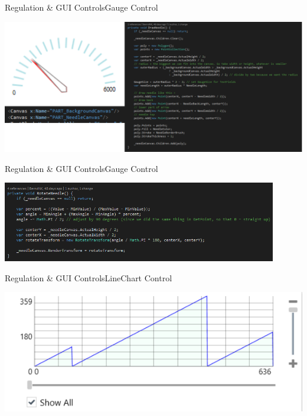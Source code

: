 	\begin{frame}{Regulation \& GUI Controls}{Gauge Control}
		\begin{center}		
			\includegraphics[width=1.05\textwidth]{../regulation/GaugeControlComplete.png}	
		\end{center}
	\end{frame}

\begin{frame}{Regulation \& GUI Controls}{Gauge Control}
	\begin{center}		
		\includegraphics[width=0.9\textwidth]{../regulation/RotateNeedle.png}	
	\end{center}
\end{frame}

	\begin{frame}{Regulation \& GUI Controls}{LineChart Control}
		\begin{center}			
			\includegraphics[width=1.05\textwidth]{../regulation/LineChart.png}
		\end{center}
	\end{frame}

